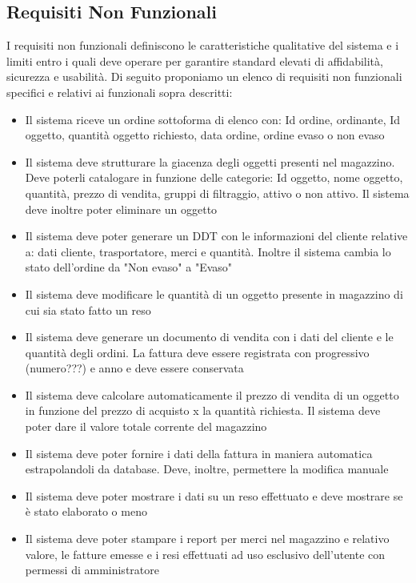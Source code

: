 \documentclass[a4paper,12pt]{article}
\begin{document}
	\subsection{Requisiti Non Funzionali}
	I requisiti non funzionali definiscono le caratteristiche qualitative del sistema e i limiti entro i quali deve operare per garantire standard elevati di affidabilità, sicurezza e usabilità. Di
	seguito proponiamo un elenco di requisiti non funzionali specifici e relativi ai funzionali sopra descritti:
	\begin{itemize}
		\item Il sistema riceve un ordine sottoforma di elenco con: Id ordine, ordinante, Id oggetto, quantità oggetto richiesto, data ordine, ordine evaso o non evaso
		\item Il sistema deve strutturare la giacenza degli oggetti presenti nel magazzino. Deve poterli catalogare in funzione delle categorie: Id oggetto, nome oggetto, quantità, prezzo di vendita,
		gruppi di filtraggio, attivo o non attivo. Il sistema deve inoltre poter eliminare un oggetto
		\item Il sistema deve poter generare un DDT con le informazioni del cliente relative a: dati cliente, trasportatore, merci e quantità. Inoltre il sistema cambia lo stato dell'ordine da
		"Non evaso" a "Evaso"
		\item Il sistema deve modificare le quantità di un oggetto presente in magazzino di cui sia stato fatto un reso
		\item Il sistema deve generare un documento di vendita con i dati del cliente e le quantità degli ordini. La fattura deve essere registrata con progressivo (numero???) e anno e deve essere
		conservata
		\item Il sistema deve calcolare automaticamente il prezzo di vendita di un oggetto in funzione del prezzo di acquisto x la quantità richiesta. Il sistema deve poter dare il valore totale
		corrente del magazzino
		\item Il sistema deve poter fornire i dati della fattura in maniera automatica estrapolandoli da database. Deve, inoltre, permettere la modifica manuale
		\item Il sistema deve poter mostrare i dati su un reso effettuato e deve mostrare se è stato elaborato o meno
		\item Il sistema deve poter stampare i report per merci nel magazzino e relativo valore, le fatture emesse e i resi effettuati ad uso esclusivo dell'utente con permessi di amministratore
	\end{itemize}
	
\end{document}
